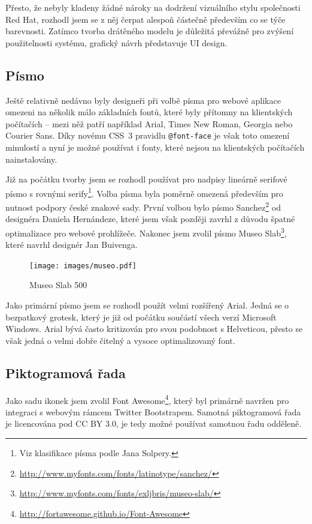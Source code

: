 Přesto, že nebyly kladeny žádné nároky na dodržení vizuálního stylu společnosti Red Hat, rozhodl jsem se z něj čerpat alespoň částečně především co se týče barevnosti. Zatímco tvorba drátěného modelu je důležitá převážně pro zvýšení použitelnosti systému, grafický návrh představuje UI design.

\subsection{Písmo}

Ještě relativně nedávno byly designeři při volbě písma pro webové aplikace omezeni na několik málo základních fontů, které byly přítomny na klientských počítačích -- mezi něž patří například Arial, Times New Roman, Georgia nebo Courier Sans. Díky novému CSS~3 pravidlu \texttt{@font-face} je však toto omezení minulostí a nyní je možné používat i fonty, které nejsou na klientských počítačích nainstalovány.

Již na počátku tvorby jsem se rozhodl používat pro nadpisy lineárně serifové písmo s rovnými serify\footnote{Viz klasifikace písma podle Jana Solpery.}. Volba písma byla poměrně omezená především pro nutnost podpory české znakové sady. První volbou bylo písmo Sanchez\footnote{\url{http://www.myfonts.com/fonts/latinotype/sanchez/}} od designéra Daniela Hernándeze, které jsem však později zavrhl z důvodu špatné optimalizace pro webové prohlížeče. Nakonec jsem zvolil písmo Museo Slab\footnote{\url{http://www.myfonts.com/fonts/exljbris/museo-slab/}}, které navrhl designér Jan Buivenga.

\begin{figure}[htbp]
    \centering
    \texttt{[image: images/museo.pdf]}
    \caption{Museo Slab 500}
    \label{img:museo}
\end{figure}

Jako primární písmo jsem se rozhodl použít velmi rozšířený Arial. Jedná se o bezpatkový grotesk, který je již od počátku součástí všech verzí Microsoft Windows. Arial bývá často kritizován pro svou podobnost s Helveticou, přesto se však jedná o velmi dobře čitelný a vysoce optimalizovaný font.

\subsection{Piktogramová řada}

Jako sadu ikonek jsem zvolil Font Awesome\footnote{\url{http://fortawesome.github.io/Font-Awesome}}, který byl primárně navržen pro integraci s webovým rámcem Twitter Bootstrapem. Samotná piktogramová řada je licencována pod CC BY 3.0, je tedy možné používat samotnou řadu odděleně.

